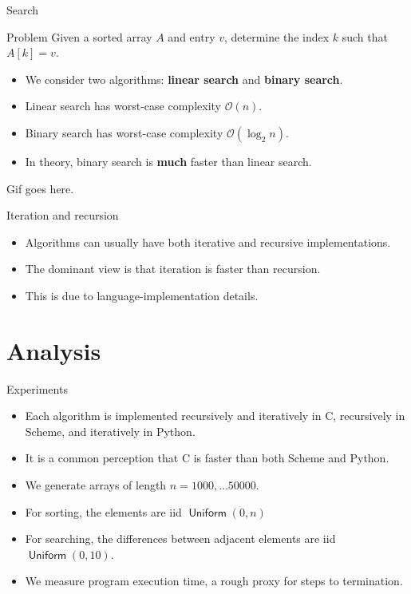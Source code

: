 \documentclass[]{beamer}
\renewcommand{\emph}{\textbf}
\newcommand{\Order}{\mathcal{O}}
\DeclareMathOperator*{\uniform}{\mathsf{Uniform}}
\begin{document}
\begin{frame}[t]{Search}
\begin{block}{Problem}
Given a sorted array $A$ and entry $v$, determine the index $k$ such that $A[k] = v$.
\end{block}
\begin{itemize}
	\item We consider two algorithms: \emph{linear search} and \emph{binary search}.
    \item Linear search has worst-case complexity $\Order(n)$.
    \item Binary search has worst-case complexity $\Order(\log_2 n)$.
    \item In theory, binary search is \emph{much} faster than linear search.
\end{itemize}
\end{frame}

\begin{frame}
Gif goes here.
\end{frame}

\begin{frame}[t]{Iteration and recursion}
\begin{itemize}
	\item Algorithms can usually have both iterative and recursive implementations.
    \item The dominant view is that iteration is faster than recursion.
    \item This is due to language-implementation details.
\end{itemize}
\end{frame}


\section{Analysis}
\begin{frame}[t]{Experiments}
	\begin{itemize}
    \item Each algorithm is implemented recursively and iteratively in C, recursively in Scheme, and iteratively in Python.
    \item It is a common perception that C is faster than both Scheme and Python.
    \item We generate arrays of length $n = 1000, \ldots 50000$.
    \item For sorting, the elements are iid $\uniform(0, n)$
    \item For searching, the differences between adjacent elements are iid $\uniform(0,10)$.
	\item We measure program execution time, a rough proxy for steps to termination.
\end{itemize}
\end{frame}
\end{document}

